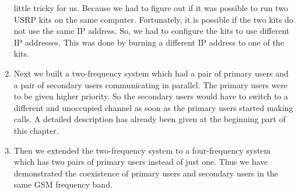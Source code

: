 \begin{enumerate}
    little tricky for us. Because we had to figure out if it was possible to
    run two USRP kits on the same computer. Fortunately, it is possible if the
    two kits do not use the same IP address. So, we had to configure the kits
    to use different IP addresses. This was done by burning a different IP 
    address to one of the kits.
    \item Next we built a two-frequency system which had a pair of primary 
    users and a pair of secondary users communicating in parallel. The primary
    users were to be given higher priority. So the secondary users would have
    to switch to a different and unoccupied channel as soon as the primary 
    users started making calls. A detailed description has already been given
    at the beginning part of this chapter.
    \item Then we extended the two-frequency system to a four-frequency system
    which has two pairs of primary users instead of just one. Thus we have 
    demonstrated the coexistence of primary users and secondary users in the 
    same GSM frequency band.
\end{enumerate}



